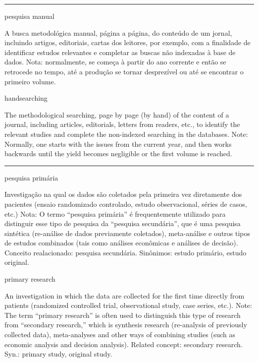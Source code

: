 \documentclass[
  openany]{book}
\begin{document}
\begin{center}\rule{0.5\linewidth}{0.5pt}\end{center}

pesquisa manual

A busca metodológica manual, página a página, do conteúdo de um jornal, incluindo artigos, editoriais, cartas dos leitores, por exemplo, com a finalidade de identificar estudos relevantes e completar as buscas não indexadas à base de dados. Nota: normalmente, se começa à partir do ano corrente e então se retrocede no tempo, até a produção se tornar desprezível ou até se encontrar o primeiro volume.

handsearching

The methodological searching, page by page (by hand) of the content of a journal, including articles, editorials, letters from readers, etc., to identify the relevant studies and complete the non-indexed searching in the databases. Note: Normally, one starts with the issues from the current year, and then works backwards until the yield becomes negligible or the first volume is reached.

\begin{center}\rule{0.5\linewidth}{0.5pt}\end{center}

pesquisa primária

Investigação na qual os dados são coletados pela primeira vez diretamente dos pacientes (ensaio randomizado controlado, estudo observacional, séries de casos, etc.) Nota: O termo ``pesquisa primária'' é frequentemente utilizado para distinguir esse tipo de pesquisa da ``pesquisa secundária'', que é uma pesquisa sintética (re-análise de dados previamente coletados), meta-análise e outros tipos de estudos combinados (tais como análises econômicas e análises de decisão). Conceito realacionado: pesquisa secundária. Sinônimos: estudo primário, estudo original.

primary research

An investigation in which the data are collected for the first time directly from patients (randomized controlled trial, observational study, case series, etc.). Note: The term ``primary research'' is often used to distinguish this type of research from ``secondary research,'' which is synthesis research (re-analysis of previously collected data), meta-analyses and other ways of combining studies (such as economic analysis and decision analysis). Related concept: secondary research. Syn.: primary study, original study.
\end{document}
